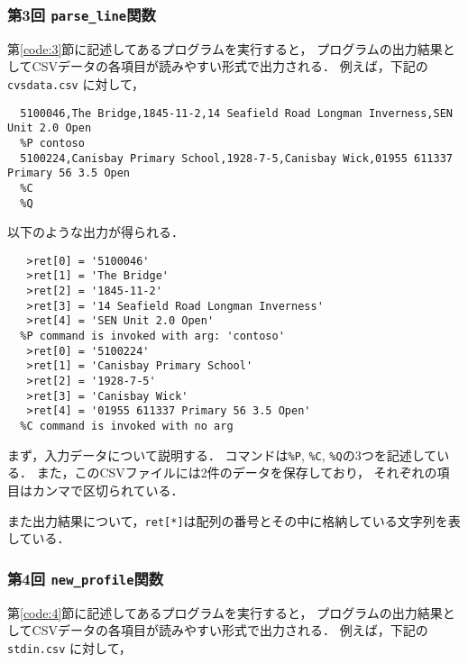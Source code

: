 \documentclass[autodetect-engine,dvi=dvipdfmx,ja=standard,
               a4j,11pt]{bxjsarticle}
\begin{document}
\subsubsection{第3回 \texttt{parse\_line}関数}

第\ref{code:3}節に記述してあるプログラムを実行すると，
プログラムの出力結果としてCSVデータの各項目が読みやすい形式で出力される．
例えば，下記の \verb|cvsdata.csv| に対して，

{\fontsize{10pt}{11pt} \selectfont
 \begin{verbatim}
  5100046,The Bridge,1845-11-2,14 Seafield Road Longman Inverness,SEN Unit 2.0 Open
  %P contoso
  5100224,Canisbay Primary School,1928-7-5,Canisbay Wick,01955 611337 Primary 56 3.5 Open
  %C
  %Q
 \end{verbatim}
}

\noindent
以下のような出力が得られる．

{\fontsize{10pt}{11pt} \selectfont
 \begin{verbatim}
   >ret[0] = '5100046'
   >ret[1] = 'The Bridge'
   >ret[2] = '1845-11-2'
   >ret[3] = '14 Seafield Road Longman Inverness'
   >ret[4] = 'SEN Unit 2.0 Open'
  %P command is invoked with arg: 'contoso'
   >ret[0] = '5100224'
   >ret[1] = 'Canisbay Primary School'
   >ret[2] = '1928-7-5'
   >ret[3] = 'Canisbay Wick'
   >ret[4] = '01955 611337 Primary 56 3.5 Open'
  %C command is invoked with no arg
 \end{verbatim}
}

まず，入力データについて説明する．
コマンドは\verb|%P|, \verb|%C|, \verb|%Q|の3つを記述している．
また，このCSVファイルには2件のデータを保存しており，
それぞれの項目はカンマで区切られている．

また出力結果について，\verb|ret[*]|は配列の番号とその中に格納している文字列を表している．

\subsubsection{第4回 \texttt{new\_profile}関数}

第\ref{code:4}節に記述してあるプログラムを実行すると，
プログラムの出力結果としてCSVデータの各項目が読みやすい形式で出力される．
例えば，下記の \verb|stdin.csv| に対して，
\end{document}
